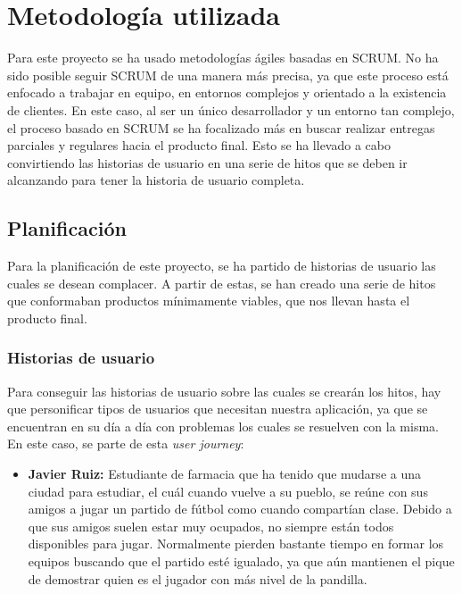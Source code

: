 \chapter{Metodología utilizada}

Para este proyecto se ha usado metodologías ágiles basadas en SCRUM. No ha sido posible seguir SCRUM de una manera más precisa, ya que este proceso está enfocado a trabajar en
equipo, en entornos complejos y orientado a la existencia de clientes. En este caso, al ser un único desarrollador y un entorno tan complejo, el proceso basado en SCRUM se ha
focalizado más en buscar realizar entregas parciales y regulares hacia el producto final. Esto se ha llevado a cabo convirtiendo las historias de usuario en una serie de hitos
que se deben ir alcanzando para tener la historia de usuario completa.\\

\section{Planificación}

Para la planificación de este proyecto, se ha partido de historias de usuario las cuales se desean complacer. A partir de estas, se han creado una serie de hitos que conformaban productos mínimamente viables,
 que nos llevan hasta el producto final.

\subsection{Historias de usuario}

Para conseguir las historias de usuario sobre las cuales se crearán los hitos, hay que personificar tipos de usuarios que necesitan nuestra aplicación, ya que se encuentran en su día a día
con problemas los cuales se resuelven con la misma. En este caso, se parte de esta \textit{user journey}:

\newpage

\begin{itemize}
    \item \textbf{Javier Ruiz:} Estudiante de farmacia que ha tenido que mudarse a una ciudad para estudiar, el cuál cuando vuelve a su pueblo,
     se reúne con sus amigos a jugar un partido de fútbol como cuando compartían clase. Debido a que sus amigos suelen estar muy ocupados,
     no siempre están todos disponibles para jugar. Normalmente pierden bastante tiempo en formar los equipos buscando que el partido esté igualado,
     ya que aún mantienen el pique de demostrar quien es el jugador con más nivel de la pandilla. 
    
\end{itemize}

